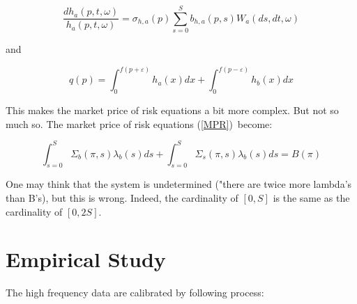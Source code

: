 \documentclass{article}
\begin{document}
\begin{equation*}
\frac{dh_{a}(p,t,\omega )}{h_{a}(p,t,\omega )}=\sigma
_{h,a}(p)\sum_{s=0}^{S}b_{h,a}(p,s)W_{a}(ds,dt,\omega )
\end{equation*}

and

\begin{equation*}
q(p)=\int_{0}^{f(p+\varepsilon )}h_{a}(x)dx+\int_{0}^{f(p-\varepsilon
)}h_{b}(x)dx
\end{equation*}

This makes the market price of risk equations a bit more complex. But not so
much so. The market price of risk equations (\ref{MPR})\ become:

\begin{equation*}
\int_{s=0}^{S}\Sigma _{b}(\pi ,s)\lambda _{b}(s)ds+\int_{s=0}^{S}\Sigma
_{s}(\pi ,s)\lambda _{b}(s)ds=B(\pi )
\end{equation*}

One may think that the system is undetermined ("there are twice more
lambda's than B's), but this is wrong. Indeed, the cardinality of $[0,S]$ is
the same as the cardinality of $[0,2S].$

\pagebreak

\section{Empirical Study}

The high frequency data are calibrated by following process:
\end{document}
